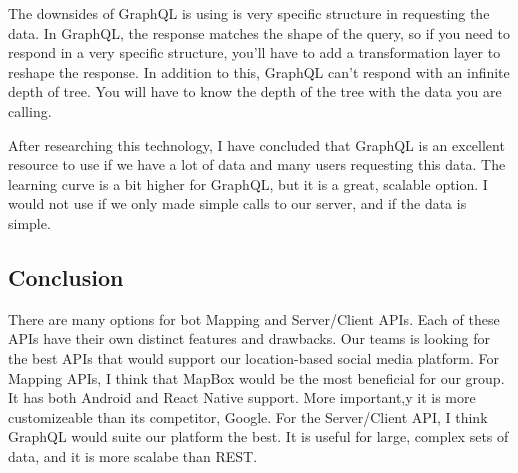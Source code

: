 \documentclass[draftclsnofoot, onecolumn, compsoc, 10pt]{IEEEtran}
\begin{document}
    The downsides of GraphQL is using is very specific structure in requesting the data. In GraphQL, the response matches the shape of the query, so if you need to respond in a very specific structure, you'll have to add a transformation layer to reshape the response. In addition to this, GraphQL can’t respond with an infinite depth of tree. You will have to know the depth of the tree with the data you are calling. 

    After researching this technology, I have concluded that GraphQL is an excellent resource to use if we have a lot of data and many users requesting this data. The learning curve is a bit higher for GraphQL, but it is a great, scalable option. I would not use if we only made simple calls to our server, and if the data is simple.
    \cite{RestvsGraph}
    \cite{GraphQLCons}
    
    \subsection{Conclusion}
    There are many options for bot Mapping and Server/Client APIs. Each of these APIs have their own distinct features and drawbacks. Our teams is looking for the best APIs that would support our location-based social media platform. For Mapping APIs, I think that MapBox would be the most beneficial for our group. It has both Android and React Native support. More important,y it is more customizeable than its competitor, Google. For the Server/Client API, I think GraphQL would suite our platform the best. It is useful for large, complex sets of data, and it is more scalabe than REST.
    




		

	
\newpage


\end{document}

